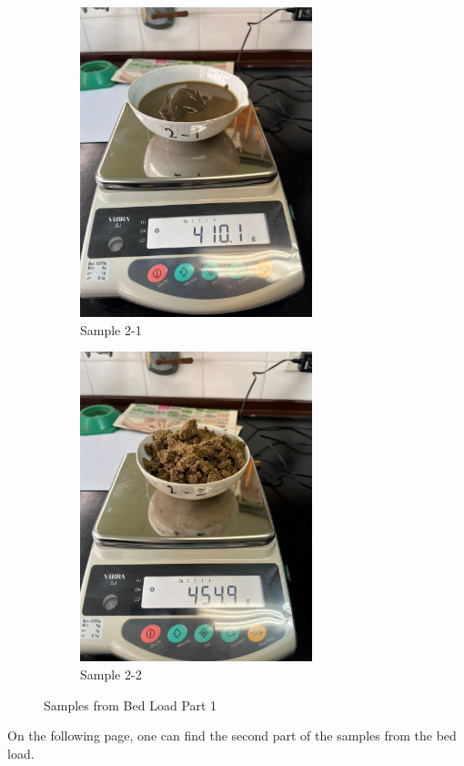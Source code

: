 \begin{figure}[H]
    \vspace{0.5cm}

    \begin{subfigure}[b]{0.48\textwidth}
        \includegraphics[width=\linewidth, height =9cm]{figures/appendix-f/2-1.jpg}
        \caption{Sample 2-1}
        \label{fig:second}
    \end{subfigure}
    \hfill
    \begin{subfigure}[b]{0.48\textwidth}
        \includegraphics[width=\linewidth, height =9cm]{figures/appendix-f/2-2.jpg}
        \caption{Sample 2-2}
        \label{fig:second}
    \end{subfigure}

    \caption{Samples from Bed Load Part 1}
    \label{fig:all four 1}
\end{figure}
\clearpage
On the following page, one can find the second part of the samples from the bed load.

